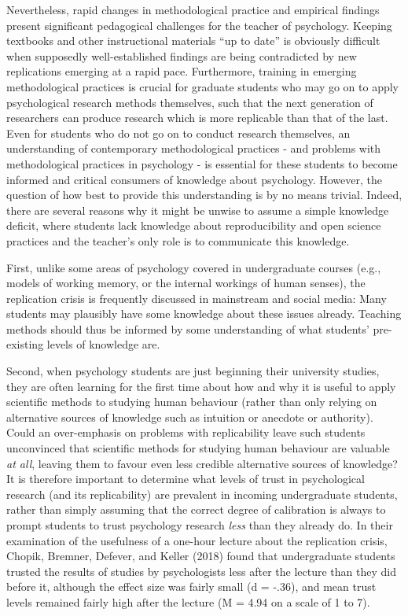 \documentclass[
  english,
  man,mask,floatsintext]{apa6}
\begin{document}
Nevertheless, rapid changes in methodological practice and empirical findings present significant pedagogical challenges for the teacher of psychology. Keeping textbooks and other instructional materials \enquote{up to date} is obviously difficult when supposedly well-established findings are being contradicted by new replications emerging at a rapid pace. Furthermore, training in emerging methodological practices is crucial for graduate students who may go on to apply psychological research methods themselves, such that the next generation of researchers can produce research which is more replicable than that of the last. Even for students who do not go on to conduct research themselves, an understanding of contemporary methodological practices - and problems with methodological practices in psychology - is essential for these students to become informed and critical consumers of knowledge about psychology. However, the question of how best to provide this understanding is by no means trivial. Indeed, there are several reasons why it might be unwise to assume a simple knowledge deficit, where students lack knowledge about reproducibility and open science practices and the teacher's only role is to communicate this knowledge.

First, unlike some areas of psychology covered in undergraduate courses (e.g., models of working memory, or the internal workings of human senses), the replication crisis is frequently discussed in mainstream and social media: Many students may plausibly have some knowledge about these issues already. Teaching methods should thus be informed by some understanding of what students' pre-existing levels of knowledge are.

Second, when psychology students are just beginning their university studies, they are often learning for the first time about how and why it is useful to apply scientific methods to studying human behaviour (rather than only relying on alternative sources of knowledge such as intuition or anecdote or authority). Could an over-emphasis on problems with replicability leave such students unconvinced that scientific methods for studying human behaviour are valuable \emph{at all}, leaving them to favour even less credible alternative sources of knowledge? It is therefore important to determine what levels of trust in psychological research (and its replicability) are prevalent in incoming undergraduate students, rather than simply assuming that the correct degree of calibration is always to prompt students to trust psychology research \emph{less} than they already do. In their examination of the usefulness of a one-hour lecture about the replication crisis, Chopik, Bremner, Defever, and Keller (2018) found that undergraduate students trusted the results of studies by psychologists less after the lecture than they did before it, although the effect size was fairly small (d = -.36), and mean trust levels remained fairly high after the lecture (M = 4.94 on a scale of 1 to 7).
\end{document}
